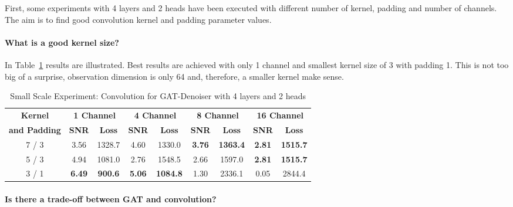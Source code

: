 First, some experiments with 4 layers and 2 heads have been executed with different number of kernel, padding and number of channels.
The aim is to find good convolution kernel and padding parameter values.

\paragraph{What is a good kernel size?}

In Table~\ref{tab:small_convolution} results are illustrated. 
Best results are achieved with only 1 channel and smallest kernel size of 3 with padding 1.
This is not too big of a surprise, observation dimension is only 64 and, therefore, a smaller kernel make sense.


\begin{table}[H]
  \centering
  \begin{tabular}{c|cc|cc|cc|cc}
    \toprule
    \textbf{Kernel}  & \multicolumn{2}{c|}{\textbf{1 Channel}} & \multicolumn{2}{c|}{\textbf{4 Channel}} & \multicolumn{2}{c|}{\textbf{8 Channel}} & \multicolumn{2}{c}{\textbf{16 Channel}} \\
    \textbf{and Padding}  & \small \textbf{SNR} & \small \textbf{Loss} & \small \textbf{SNR} & \small \textbf{Loss} & \small \textbf{SNR} & \small \textbf{Loss} & \small \textbf{SNR} & \small \textbf{Loss} \\ 
    \midrule
      7 / 3 & 3.56 & 1328.7                  & 4.60  &  1330.0                   & \textbf{3.76} & \textbf{1363.4} & \textbf{2.81}  & \textbf{1515.7} \\ \hline
      5 / 3 & 4.94 & 1081.0                  & 2.76  &  1548.5                   & 2.66 & 1597.0                   & \textbf{2.81}  & \textbf{1515.7} \\ \hline
      3 / 1 & \textbf{6.49} & \textbf{900.6} & \textbf{5.06}  &  \textbf{1084.8} & 1.30 & 2336.1                   & 0.05  & 2844.4 \\

    \midrule
  \end{tabular}

  \caption{Small Scale Experiment: Convolution for GAT-Denoiser with 4 layers and 2 heads}
  \label{tab:small_convolution}
\end{table}

\paragraph{Is there a trade-off between GAT and convolution?}

